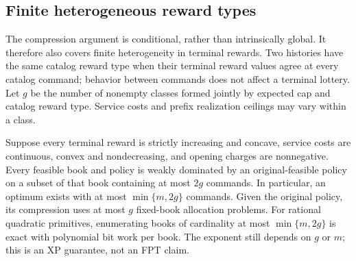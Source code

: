 \subsection{Finite heterogeneous reward types}\label{sec:types57}
The compression argument is conditional, rather than intrinsically global. It therefore also covers finite heterogeneity in terminal rewards. Two histories have the same catalog reward type when their terminal reward values agree at every catalog command; behavior between commands does not affect a terminal lottery. Let $g$ be the number of nonempty classes formed jointly by expected cap and catalog reward type. Service costs and prefix realization ceilings may vary within a class.

\begin{theorem}\label{thm:types57}
Suppose every terminal reward is strictly increasing and concave, service costs are continuous, convex and nondecreasing, and opening charges are nonnegative. Every feasible book and policy is weakly dominated by an original-feasible policy on a subset of that book containing at most $2g$ commands. In particular, an optimum exists with at most $\min\{m,2g\}$ commands. Given the original policy, its compression uses at most $g$ fixed-book allocation problems. For rational quadratic primitives, enumerating books of cardinality at most $\min\{m,2g\}$ is exact with polynomial bit work per book. The exponent still depends on $g$ or $m$; this is an XP guarantee, not an FPT claim.
\end{theorem}
